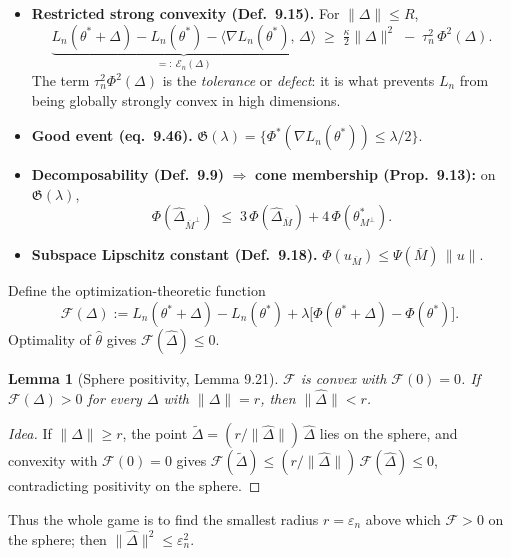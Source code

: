 \documentclass[11pt]{article}
\newtheorem{lemma}{Lemma}
\theoremstyle{definition}
\newcommand{\Ln}{L_n}
\newcommand{\thetast}{\theta^{*}}
\newcommand{\Mbar}{\overline{M}}
\newcommand{\Mperp}{M^{\perp}}
\newcommand{\Mbarperp}{\overline{M}^{\perp}}
\newcommand{\Phid}{\Phi^{*}}
\newcommand{\PsM}{\Psi(\Mbar)}
\newcommand{\norm}[1]{\lVert #1 \rVert}
\newcommand{\ip}[2]{\langle #1,\, #2 \rangle}
\newcommand{\Fcal}{\mathcal{F}}
\begin{document}
\begin{itemize}[leftmargin=1.4em]
\item \textbf{Restricted strong convexity (Def.\ 9.15).} For $\norm{\Delta}\le R$,
\begin{equation}\label{eq:rsc}
  \underbrace{\Ln(\thetast+\Delta)-\Ln(\thetast)-\ip{\nabla\Ln(\thetast)}{\Delta}}_{=:~\mathcal{E}_n(\Delta)}
  \;\ge\; \tfrac{\kappa}{2}\norm{\Delta}^2 \;-\; \tau_n^2\,\Phi^2(\Delta).
\end{equation}
The term $\tau_n^2\Phi^2(\Delta)$ is the \emph{tolerance} or \emph{defect}: it is what prevents
$\Ln$ from being globally strongly convex in high dimensions.
\item \textbf{Good event (eq.\ 9.46).} $\mathfrak{G}(\lambda)=\{\Phid(\nabla\Ln(\thetast))\le\lambda/2\}$.
\item \textbf{Decomposability (Def.\ 9.9)} $\Rightarrow$ \textbf{cone membership (Prop.\ 9.13):} on
$\mathfrak{G}(\lambda)$,
\begin{equation}\label{eq:cone}
  \Phi(\widehat\Delta_{\Mbarperp}) \;\le\; 3\,\Phi(\widehat\Delta_{\Mbar}) + 4\,\Phi(\thetast_{\Mperp}).
\end{equation}
\item \textbf{Subspace Lipschitz constant (Def.\ 9.18).} $\Phi(u_{\Mbar})\le\PsM\,\norm{u}$.
\end{itemize}

Define the optimization-theoretic function
\begin{equation}\label{eq:Fcal}
  \Fcal(\Delta) := \Ln(\thetast+\Delta)-\Ln(\thetast) + \lambda\big[\Phi(\thetast+\Delta)-\Phi(\thetast)\big].
\end{equation}
Optimality of $\widehat\theta$ gives $\Fcal(\widehat\Delta)\le0$.

\begin{lemma}[Sphere positivity, Lemma 9.21]\label{lem:sphere}
$\Fcal$ is convex with $\Fcal(0)=0$. If $\Fcal(\Delta)>0$ for every $\Delta$ with $\norm{\Delta}=r$,
then $\norm{\widehat\Delta}< r$.
\end{lemma}
\begin{proof}[Idea]
If $\norm{\widehat\Delta}\ge r$, the point $\widetilde\Delta=(r/\norm{\widehat\Delta})\,\widehat\Delta$
lies on the sphere, and convexity with $\Fcal(0)=0$ gives
$\Fcal(\widetilde\Delta)\le (r/\norm{\widehat\Delta})\,\Fcal(\widehat\Delta)\le0$, contradicting
positivity on the sphere.
\end{proof}

Thus the whole game is to find the smallest radius $r=\varepsilon_n$ above which $\Fcal>0$ on the
sphere; then $\norm{\widehat\Delta}^2\le\varepsilon_n^2$.
\end{document}
